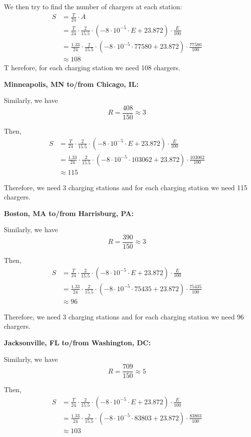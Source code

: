 We then try to find the number of chargers at each station:
\begin{align*}
	S &= \frac{T}{24}\cdot A\\
	&= \frac{T}{24}\cdot \frac{2}{15.5}\cdot(-8\cdot10^{-5}\cdot E+23.872)\cdot \frac{E}{100}\\
	&= \frac{1.33}{24}\cdot \frac{2}{15.5}\cdot(-8\cdot10^{-5}\cdot 77580+23.872)\cdot \frac{77580}{100}\\
	&\approx 108
\end{align*}
T
herefore, for each charging station we need 108 chargers. 

\noindent
\textbf{Minneapolis, MN to/from Chicago, IL:}

Similarly, we have
\[R = \frac{408}{150} \approx 3\]

Then,
\begin{align*}
	S &= \frac{T}{24}\cdot \frac{2}{15.5}\cdot(-8\cdot10^{-5}\cdot E+23.872)\cdot \frac{E}{100}\\
	&= \frac{1.33}{24}\cdot \frac{2}{15.5}\cdot(-8\cdot10^{-5}\cdot 103062+23.872)\cdot \frac{103062}{100}\\
	&\approx 115
\end{align*}

Therefore, we need 3 charging stations and for each charging station we need 115 chargers. 

\noindent
\textbf{Boston, MA to/from Harrisburg, PA:}

Similarly, we have
\[R = \frac{390}{150} \approx 3\]

Then,
\begin{align*}
	S &= \frac{T}{24}\cdot \frac{2}{15.5}\cdot(-8\cdot10^{-5}\cdot E+23.872)\cdot \frac{E}{100}\\
	&= \frac{1.33}{24}\cdot \frac{2}{15.5}\cdot(-8\cdot10^{-5}\cdot 75435+23.872)\cdot \frac{75435}{100}\\
	&\approx 96
\end{align*}

Therefore, we need 3 charging stations and for each charging station we need 96 chargers.

\noindent
\textbf{Jacksonville, FL to/from Washington, DC:}

Similarly, we have
\[R = \frac{709}{150} \approx 5\]

Then,
\begin{align*}
	S &= \frac{T}{24}\cdot \frac{2}{15.5}\cdot(-8\cdot10^{-5}\cdot E+23.872)\cdot \frac{E}{100}\\
	&= \frac{1.33}{24}\cdot \frac{2}{15.5}\cdot(-8\cdot10^{-5}\cdot 83803+23.872)\cdot \frac{83803}{100}\\
	&\approx 103
\end{align*}

